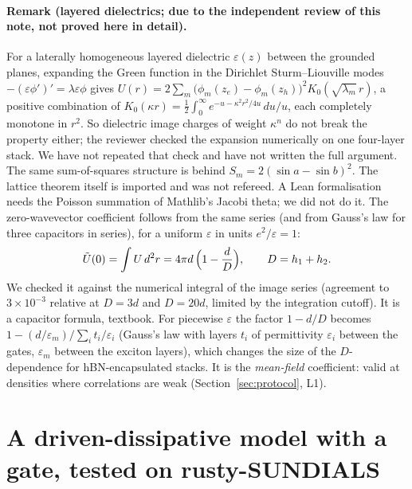 \documentclass[11pt,a4paper]{article}
\begin{document}
\paragraph{Remark (layered dielectrics; due to the independent review of this note, not proved here in detail).} For a laterally
homogeneous layered dielectric $\varepsilon(z)$ between the grounded planes, expanding the Green function in the Dirichlet
Sturm--Liouville modes $-(\varepsilon\phi')'=\lambda\varepsilon\phi$ gives
$U(r)=2\sum_m\bigl(\phi_m(z_e)-\phi_m(z_h)\bigr)^2K_0(\sqrt{\lambda_m}\,r)$, a positive combination of $K_0(\kappa r)=\tfrac12\int_0^\infty
e^{-u-\kappa^2r^2/4u}\,du/u$, each completely monotone in $r^2$. So dielectric image charges of weight $\kappa^n$ do not break the property
either; the reviewer checked the expansion numerically on one four-layer stack. We have not repeated that check and have not written the full argument.
The same sum-of-squares structure is behind $S_m=2(\sin a-\sin b)^2$. The lattice theorem itself is imported and was not refereed.
A Lean formalisation needs the Poisson summation of Mathlib's Jacobi theta; we did not do it. The zero-wavevector coefficient
follows from the same series (and from Gauss's law for three capacitors in series), for a uniform $\varepsilon$ in units $e^2/\varepsilon=1$:
\begin{equation}\label{eq:u0}
\tilde U(0)=\int U\,d^2r=4\pi d\,\Bigl(1-\frac dD\Bigr),\qquad D=h_1+h_2 .
\end{equation}
We checked it against the numerical integral of the image series (agreement to $3\times10^{-3}$ relative at $D=3d$ and $D=20d$, limited by the integration cutoff).
It is a capacitor formula, textbook. For piecewise $\varepsilon$ the factor $1-d/D$ becomes $1-(d/\varepsilon_m)/\sum_it_i/\varepsilon_i$ (Gauss's law with layers $t_i$ of permittivity $\varepsilon_i$ between the gates, $\varepsilon_m$ between the exciton layers), which changes the size of the $D$-dependence for hBN-encapsulated stacks. It is the \emph{mean-field} coefficient: valid at densities where correlations are weak (Section~\ref{sec:protocol}, L1).

\section{A driven-dissipative model with a gate, tested on rusty-SUNDIALS}\label{sec:dd}
\end{document}
